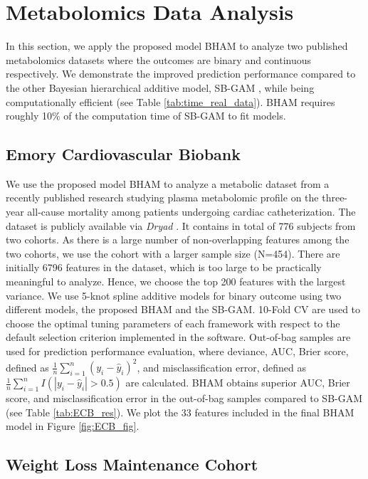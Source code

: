 \documentclass[AMA,STIX1COL,]{WileyNJD-v2}
\begin{document}
\section{Metabolomics Data Analysis}
\label{sec:real_data}

In this section, we apply the proposed model BHAM to analyze two
published metabolomics datasets where the outcomes are binary and
continuous respectively. We demonstrate the improved prediction
performance compared to the other Bayesian hierarchical additive model,
SB-GAM \citep{Bai2021}, while being computationally efficient (see Table
\ref{tab:time_real_data}). BHAM requires roughly 10\% of the computation
time of SB-GAM to fit models.

\subsection{Emory Cardiovascular Biobank}
\label{sec:ECB}

We use the proposed model BHAM to analyze a metabolic dataset from a
recently published research \citep{Mehta2020} studying plasma
metabolomic profile on the three-year all-cause mortality among patients
undergoing cardiac catheterization. The dataset is publicly available
via \textit{Dryad} \citep{Mehta2020_data}. It contains in total of 776
subjects from two cohorts. As there is a large number of non-overlapping
features among the two cohorts, we use the cohort with a larger sample
size (N=454). There are initially 6796 features in the dataset, which is
too large to be practically meaningful to analyze. Hence, we choose the
top 200 features with the largest variance. We use 5-knot spline
additive models for binary outcome using two different models, the
proposed BHAM and the SB-GAM. 10-Fold CV are used to choose the optimal
tuning parameters of each framework with respect to the default
selection criterion implemented in the software. Out-of-bag samples are
used for prediction performance evaluation, where deviance, AUC, Brier
score, defined as
\(\frac{1}{n}\sum\limits^{n}_{i=1}(y_i - \hat y_i)^2\), and
misclassification error, defined as
\(\frac{1}{n}\sum\limits^{n}_{i=1}I(|y_i - \hat y_i|>0.5)\) are
calculated. BHAM obtains superior AUC, Brier score, and
misclassification error in the out-of-bag samples compared to SB-GAM
(see Table \ref{tab:ECB_res}). We plot the 33 features included in the
final BHAM model in Figure \ref{fig:ECB_fig}.

\subsection{Weight Loss Maintenance Cohort}
\end{document}
